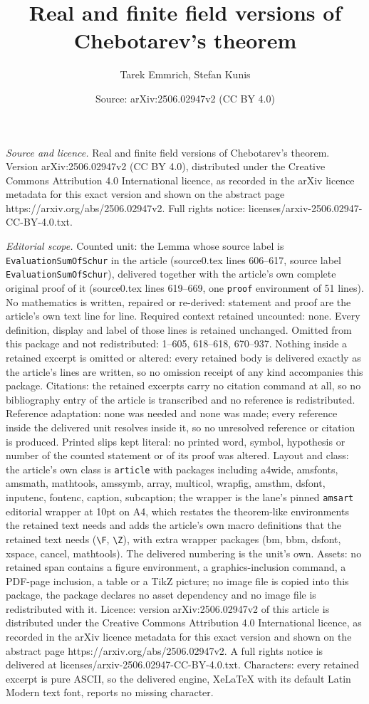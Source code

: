 \documentclass[10pt,a4paper]{amsart}
\title[Real and finite field versions of Chebotarev's theorem]{Real and finite field versions of Chebotarev's theorem}
\author{Tarek Emmrich, Stefan Kunis}
\date{Source: arXiv:2506.02947v2 (CC BY 4.0)}
\begin{document}
\maketitle

\noindent\emph{Source and licence.} Real and finite field versions of Chebotarev's theorem. Version arXiv:2506.02947v2 (CC BY 4.0), distributed under the Creative Commons Attribution 4.0 International licence, as recorded in the arXiv licence metadata for this exact version and shown on the abstract page https://arxiv.org/abs/2506.02947v2. Full rights notice: licenses/arxiv-2506.02947-CC-BY-4.0.txt.\par\smallskip

\noindent\textit{Editorial scope.} Counted unit: the Lemma whose source label is \texttt{EvaluationSumOfSchur} in the article (source0.tex lines 606--617, source label \texttt{EvaluationSumOfSchur}), delivered together with the article's own complete original proof of it (source0.tex lines 619--669, one \texttt{proof} environment of 51 lines). No mathematics is written, repaired or re-derived: statement and proof are the article's own text line for line. Required context retained uncounted: none. Every definition, display and label of those lines is retained unchanged. Omitted from this package and not redistributed: 1--605, 618--618, 670--937. Nothing inside a retained excerpt is omitted or altered: every retained body is delivered exactly as the article's lines are written, so no omission receipt of any kind accompanies this package. Citations: the retained excerpts carry no citation command at all, so no bibliography entry of the article is transcribed and no reference is redistributed. Reference adaptation: none was needed and none was made; every reference inside the delivered unit resolves inside it, so no unresolved reference or citation is produced. Printed slips kept literal: no printed word, symbol, hypothesis or number of the counted statement or of its proof was altered. Layout and class: the article's own class is \texttt{article} with packages including a4wide, amsfonts, amsmath, mathtools, amssymb, array, multicol, wrapfig, amsthm, dsfont, inputenc, fontenc, caption, subcaption; the wrapper is the lane's pinned \texttt{amsart} editorial wrapper at 10pt on A4, which restates the theorem-like environments the retained text needs and adds the article's own macro definitions that the retained text needs (\texttt{\textbackslash F}, \texttt{\textbackslash Z}), with extra wrapper packages (bm, bbm, dsfont, xspace, cancel, mathtools). The delivered numbering is the unit's own. Assets: no retained span contains a figure environment, a graphics-inclusion command, a PDF-page inclusion, a table or a TikZ picture; no image file is copied into this package, the package declares no asset dependency and no image file is redistributed with it. Licence: version arXiv:2506.02947v2 of this article is distributed under the Creative Commons Attribution 4.0 International licence, as recorded in the arXiv licence metadata for this exact version and shown on the abstract page https://arxiv.org/abs/2506.02947v2. A full rights notice is delivered at licenses/arxiv-2506.02947-CC-BY-4.0.txt. Characters: every retained excerpt is pure ASCII, so the delivered engine, XeLaTeX with its default Latin Modern text font, reports no missing character.
\end{document}
